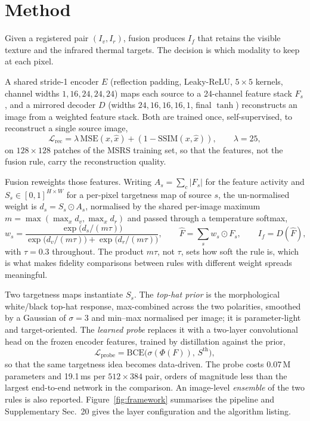 \documentclass[preprint,10pt]{elsarticle}
\begin{document}
\section{Method}
\label{sec:method}

\begin{sloppypar}
Given a registered pair $(I_v,I_r)$, fusion produces $I_f$ that retains the visible
texture and the infrared thermal targets. The decision is which modality to keep at
each pixel.

A shared stride-1 encoder $E$ (reflection padding, Leaky-ReLU, $5\times5$ kernels,
channel widths $1,16,24,24,24$) maps each source to a 24-channel feature stack
$F_s$, and a mirrored decoder $D$ (widths $24,16,16,16,1$, final $\tanh$) reconstructs
an image from a weighted feature stack. Both are trained once, self-supervised, to
reconstruct a single source image,
\begin{equation}
\mathcal{L}_{\mathrm{rec}} = \lambda\,\mathrm{MSE}(x,\hat{x}) + (1-\mathrm{SSIM}(x,\hat{x})),\qquad \lambda=25,
\end{equation}
on $128\times128$ patches of the MSRS training set, so that the features, not the
fusion rule, carry the reconstruction quality.

Fusion reweights those features. Writing $A_s=\sum_c|F_s|$ for the feature activity and
$S_s\in[0,1]^{H\times W}$ for a per-pixel targetness map of source $s$, the
un-normalised weight is $d_s=S_s\odot A_s$, normalised by the shared per-image maximum
$m=\max(\max_x d_v,\max_x d_r)$ and passed through a temperature softmax,
\begin{equation}
w_s=\frac{\exp\!\big(d_s/(m\tau)\big)}{\exp\!\big(d_v/(m\tau)\big)+\exp\!\big(d_r/(m\tau)\big)},
\qquad \hat{F}=\sum_s w_s\odot F_s,\qquad I_f=D(\hat{F}),
\label{eq:rule}
\end{equation}
with $\tau=0.3$ throughout. The product $m\tau$, not $\tau$, sets how soft the rule
is, which is what makes fidelity comparisons between rules with different weight
spreads meaningful.

Two targetness maps instantiate $S_s$. The \emph{top-hat prior} is the morphological
white/black top-hat response, max-combined across the two polarities, smoothed by a
Gaussian of $\sigma=3$ and min--max normalised per image; it is parameter-light and
target-oriented. The \emph{learned probe} replaces it with a two-layer convolutional
head on the frozen encoder features, trained by distillation against the prior,
\begin{equation}
\mathcal{L}_{\mathrm{probe}}=\mathrm{BCE}\big(\sigma(\Phi(F)),\,S^{\mathrm{th}}\big),
\end{equation}
so that the same targetness idea becomes data-driven. The probe costs 0.07\,M
parameters and 19.1\,ms per $512\times384$ pair, orders of magnitude less than the
largest end-to-end network in the comparison. An image-level \emph{ensemble} of the
two rules is also reported. Figure~\ref{fig:framework} summarises the pipeline and
Supplementary Sec.~20 gives the layer configuration and the algorithm listing.
\end{sloppypar}
\end{document}
